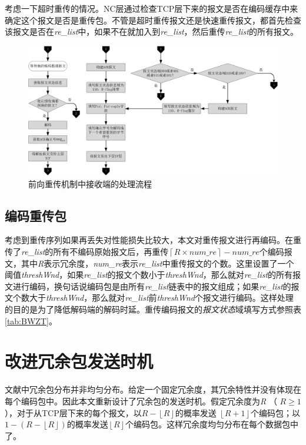 \par
考虑一下超时重传的情况。NC层通过检查TCP层下来的报文是否在编码缓存中来确定这个报文是否是重传包。不管是超时重传报文还是快速重传报文，都首先检查该报文是否在\emph{re\_list}中，如果不在就加入到\emph{re\_list}，然后重传\emph{re\_list}的所有报文。
\begin{figure}[htbp]
	\centering
	\includegraphics[width=6in]{figures/sink.eps}
	\caption{前向重传机制中接收端的处理流程}
	\label{SINK_EPS}
\end{figure}
\subsection{编码重传包}
考虑到重传序列如果再丢失对性能损失比较大，本文对重传报文进行再编码。在重传了\emph{re\_list}的所有不编码原始报文后，再重传$\left\lceil {R \times num\_re} \right\rceil  - num\_re$个编码报文，其中\emph{R}表示冗余度，\emph{num\_re}表示\emph{re\_list}中重传报文的个数。这里设置了一个阈值\emph{threshWnd}，如果\emph{re\_list}的报文个数小于\emph{threshWnd}，那么就对\emph{re\_list}的所有报文进行编码，换句话说编码包是由所有\emph{re\_list}链表中的报文组成；如果\emph{re\_list}的报文个数大于\emph{threshWnd}，那么就对\emph{re\_list}前\emph{threshWnd}个报文进行编码。这样处理的目的是为了降低解码端的解码时延。重传编码报文的\emph{报文状态}域填写方式参照表\ref{tab:BWZT}。

\section{改进冗余包发送时机}
文献\cite{Sundararajan2009}中冗余包分布并非均匀分布。给定一个固定冗余度，其冗余特性并没有体现在每个编码包中。因此本文重新设计了冗余包的发送时机。假定冗余度为\emph{R} （ $R \ge 1$ ），对于从TCP层下来的每个报文，以$R - \left\lfloor R \right\rfloor$的概率发送 $\left\lfloor R+1 \right\rfloor$个编码包；以$1-\left(R-\left\lfloor R \right\rfloor\right)$的概率发送$\left\lfloor R \right\rfloor$个编码包。这样冗余度均匀分布在每个数据包中了。
